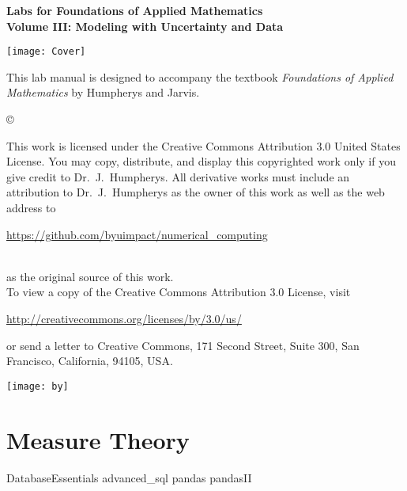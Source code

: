 \documentclass[nociteref]{SIAM-GH-book}
\begin{document}
\thispagestyle{empty}
\begin{center}
{\huge \bf Labs for Foundations of Applied Mathematics} \\
\vspace{5mm}
{\Large \bf Volume III: Modeling with
Uncertainty and Data}
\vspace{20mm}

\texttt{[image: Cover]}
\end{center}
\frontmatter




\begin{thepreface}
This lab manual is designed to accompany the textbook \emph{Foundations of Applied Mathematics} by Humpherys and Jarvis.

\vfill
\copyright{This work is licensed under the Creative Commons Attribution 3.0 United States
License.  You may copy, distribute, and display this copyrighted work only if you give
credit to Dr.~J.~Humpherys. All derivative works must include an attribution to Dr.~J.~Humpherys as the owner of this work as well as the web address to
\\\centerline{\url{https://github.com/byuimpact/numerical_computing}}\\ as the original source of
this
work.\\To view a copy of the Creative Commons Attribution 3.0 License,
visit\\\centerline{\url{http://creativecommons.org/licenses/by/3.0/us/}} or send a letter to
Creative Commons, 171 Second Street, Suite 300, San Francisco, California, 94105, USA.}

\vfill
\centering\texttt{[image: by]}
\vfill
\end{thepreface}

\setcounter{tocdepth}{1}
\tableofcontents

\mainmatter

\part{Measure Theory}
{DatabaseEssentials}
{advanced_sql}
{pandas}
{pandasII}
\end{document}
